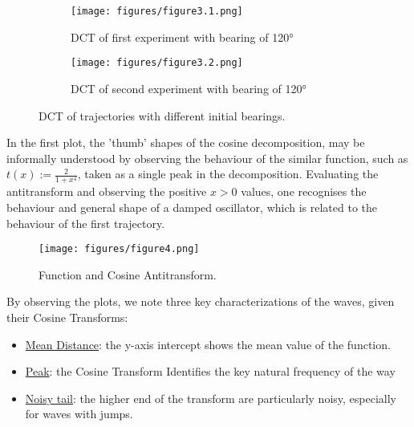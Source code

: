\documentclass[11pt]{article}
\begin{document}
            \begin{figure}[htbp]
              \centering
              \begin{subfigure}[b]{0.48\textwidth}
                \centering
                \texttt{[image: figures/figure3.1.png]}
                \caption{DCT of first experiment with bearing of 120°}
                \label{fig:dct1}
              \end{subfigure}
              \hfill
              \begin{subfigure}[b]{0.48\textwidth}
                \centering
                \texttt{[image: figures/figure3.2.png]}
                \caption{DCT of second experiment with bearing of 120°}
                \label{fig:dct2}
              \end{subfigure}
              \caption{DCT of trajectories with different initial bearings.}
              \label{fig:trajectories}
            \end{figure}

            In the first plot, the 'thumb' shapes of the cosine decomposition, may be informally understood by observing the behaviour of the similar function, such as $t(x) := \frac{2}{1+x^4}$, taken as a single peak in the decomposition. Evaluating the antitransform and observing the positive $x>0$ values, one recognises the behaviour and general shape of a damped oscillator, which is related to the behaviour of the first trajectory.

            \begin{figure}[htbp]
              \centering
              \texttt{[image: figures/figure4.png]}
              \caption{Function and Cosine Antitransform.}
              \label{fig:antitransform}
            \end{figure}

            By observing the plots, we note three key characterizations of the waves, given their Cosine Transforms:
            \begin{itemize}
              \item \underline{Mean Distance}: the y-axis intercept shows the mean value of the function.
              \item \underline{Peak}: the Cosine Transform Identifies the key natural frequency of the way
              \item \underline{Noisy tail}: the higher end of the transform are particularly noisy, especially for waves with jumps.
            \end{itemize}
\end{document}
